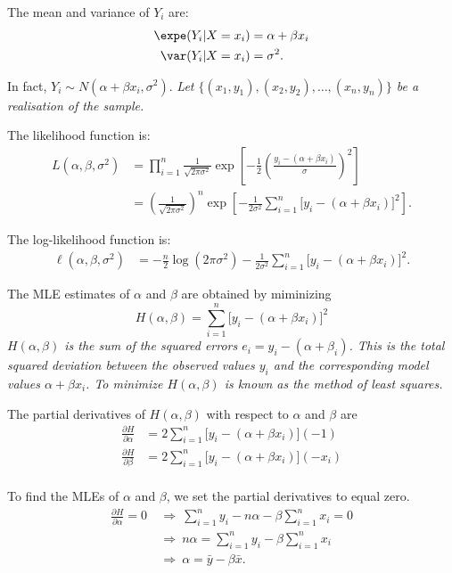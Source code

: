 The mean and variance of $Y_i$ are:
\begin{align*}
\expe(Y_i|X=x_i)
	& = \alpha + \beta x_i \\
\var(Y_i|X=x_i)
	& = \sigma^2.
\end{align*}

In fact, $Y_i\sim N(\alpha+\beta x_i, \sigma^2)$.
\bit
\it Let $\{(x_1,y_1),(x_2,y_2),\ldots,(x_n,y_n)\}$ be a realisation of the sample.
\eit

The likelihood function is:
\begin{align*}
L(\alpha,\beta,\sigma^2)
	& = \prod_{i=1}^n \frac{1}{\sqrt{2\pi\sigma^2}}\exp\left[-\frac{1}{2}\left(\frac{y_i-(\alpha+\beta x_i)}{\sigma}\right)^2\right] \\
	& = \left(\frac{1}{\sqrt{2\pi\sigma^2}}\right)^n \exp\left[-\frac{1}{2\sigma^2}\sum_{i=1}^n \big[y_i-(\alpha+\beta x_i)\big]^2\right].
\end{align*}

The log-likelihood function is:
\begin{align*}
\ell(\alpha,\beta,\sigma^2)
	& = - \frac{n}{2}\log(2\pi\sigma^2) - \frac{1}{2\sigma^2}\sum_{i=1}^n \big[y_i-(\alpha+\beta x_i)\big]^2.
\end{align*}

The MLE estimates of $\alpha$ and $\beta$ are obtained by miminizing
\[
H(\alpha,\beta) = \sum_{i=1}^n \big[y_i-(\alpha+\beta x_i)\big]^2
\]
\bit
\it $H(\alpha,\beta)$ is the sum of the squared errors $e_i=y_i-(\alpha+\beta_i)$.
\it This is the total squared deviation between the observed values $y_i$ and the corresponding model values $\alpha+\beta x_i$.
\it To minimize $H(\alpha,\beta)$ is known as the \emph{method of least squares}.
\eit

The partial derivatives of $H(\alpha,\beta)$ with respect to $\alpha$ and $\beta$ are
\begin{align*}
\frac{\partial H}{\partial\alpha} 
	& = 2\sum_{i=1}^n \big[y_i-(\alpha+\beta x_i)\big] (-1) \\
\frac{\partial H}{\partial\beta} 
	& = 2\sum_{i=1}^n \big[y_i-(\alpha+\beta x_i)\big] (-x_i) \\
\end{align*}

To find the MLEs of $\alpha$ and $\beta$, we set the partial derivatives to equal zero.
\begin{align*}
\frac{\partial H}{\partial\alpha} = 0
	& \ \Rightarrow\  \sum_{i=1}^n y_i- n\alpha -\beta\sum_{i=1}^n x_i = 0 \\
	& \ \Rightarrow\  n\alpha  = \sum_{i=1}^n y_i- \beta\sum_{i=1}^n x_i \\
	& \ \Rightarrow\  \alpha = \bar{y}-\beta\bar{x}.
\end{align*}

